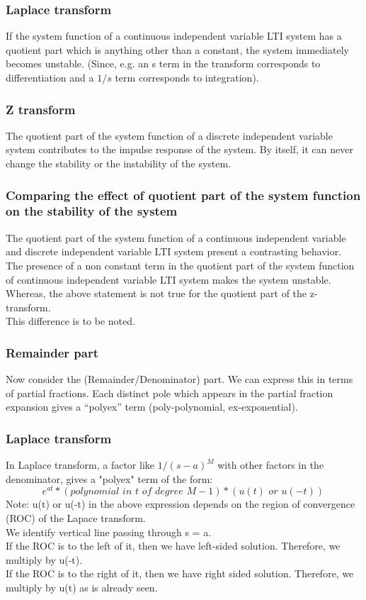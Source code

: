 \subsubsection{Laplace transform}
If the system function of a continuous independent variable LTI system has a quotient part which is anything other than a constant, the system immediately becomes unstable. (Since, e.g. an s term in the transform corresponds to differentiation and a $1/s$ term corresponds to integration).
\subsubsection{Z transform}
The quotient part of the system function of a discrete independent variable system contributes to the impulse response of the system. By itself, it can never change the stability or the instability of the system.
\subsubsection{Comparing the effect of quotient part of the system function on the stability of the system}
The quotient part of the system function of a continuous independent variable and discrete independent variable LTI system present a contrasting behavior. \\
The presence of a non constant term in the quotient part of the system function of continuous independent variable LTI system makes the system unstable. \\
Whereas, the above statement is not true for the quotient part of the z-transform. \\
This difference is to be noted. 
\subsubsection{Remainder part}
Now consider the (Remainder/Denominator) part. We can express this in terms of partial fractions. Each distinct pole which appears in the partial fraction expansion gives a “polyex” term (poly-polynomial, ex-exponential).
\subsubsection{Laplace transform}
In Laplace transform, a factor like $1/{(s-a)^M}$ with other factors in the denominator, gives a "polyex" term of the form:
\[ e^{at}*(polynomial\,\, in\,\, t\,\, of\,\, degree\,\, M-1)*(u(t)\,\, or\,\, u(-t))\, \]
Note: u(t) or u(-t) in the above expression depends on the region of convergence (ROC) of the Lapace transform.
\[ \]
We identify vertical line passing through s = a. \\ 
If the ROC is to the left of it, then we have left-sided solution. Therefore, we multiply by u(-t). \\
If the ROC is to the right of it, then we have right sided solution. Therefore, we multiply by u(t) as is already seen.
